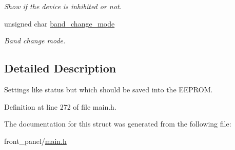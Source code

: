 \begin{CompactItemize}
\begin{CompactList}\small\item\em Show if the device is inhibited or not. \item\end{CompactList}\item 
\hypertarget{structstruct__runtime__settings_06eebb130ee972b4e5f93dd6b9f7a206}{
unsigned char \hyperlink{structstruct__runtime__settings_06eebb130ee972b4e5f93dd6b9f7a206}{band\_\-change\_\-mode}}
\label{structstruct__runtime__settings_06eebb130ee972b4e5f93dd6b9f7a206}

\begin{CompactList}\small\item\em Band change mode. \item\end{CompactList}\end{CompactItemize}


\subsection{Detailed Description}
Settings like status but which should be saved into the EEPROM. 

Definition at line 272 of file main.h.

The documentation for this struct was generated from the following file:\begin{CompactItemize}
\item 
front\_\-panel/\hyperlink{front__panel_2main_8h}{main.h}\end{CompactItemize}
